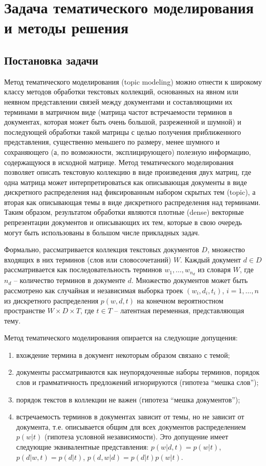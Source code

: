 \chapter{Задача тематического моделирования и методы решения}


\section{Постановка задачи}

Метод тематического моделирования (topic modeling) можно отнести к широкому классу методов обработки текстовых коллекций, основанных на явном или неявном представлении связей между документами и составляющими их терминами в матричном виде (матрица частот встречаемости терминов в документах, которая может быть очень большой, разреженной и шумной) и последующей обработки такой матрицы с целью получения приближенного представления, существенно меньшего по размеру, менее шумного и сохраняющего (а, по возможности, эксплицирующего) полезную информацию, содержащуюся в исходной матрице. Метод тематического моделирования позволяет описать текстовую коллекцию в виде произведения двух матриц, где одна матрица может интерпретироваться как описывающая документы в виде дискретного распределения над фиксированным набором скрытых тем (topic), а вторая как описывающая темы в виде дискретного распределения над терминами. Таким образом, результатом обработки являются плотные (dense) векторные репрезентации документов и описывающих их тем, которые в свою очередь могут быть использованы в большом числе прикладных задач. 

Формально, рассматривается коллекция текстовых документов $D$, множество входящих в них терминов (слов или словосочетаний) $W$. Каждый документ $d \in D$ рассматривается как последовательность терминов $w_1, \ldots, w_{n_d}$ из словаря $W$, где $n_d$ -- количество терминов в документе $d$. Множество документов может быть рассмотрено как случайная и независимая выборка троек $(w_i, d_i, t_i)$, $i = 1, \ldots, n$ из дискретного распределения $p(w, d, t)$ на конечном вероятностном пространстве $W \times D \times T$, где $t \in T$ -- латентная переменная, представляющая тему. \parencite{vorontsov2015topic}

Метод тематического моделирования опирается на следующие допущения:
\begin{enumerate}
  \item вхождение термина в документ некоторым образом связано с темой;
  \item документы рассматриваются как неупорядоченные наборы терминов, порядок слов и грамматичность предложений игнорируются (гипотеза ``мешка слов'');
  \item порядок текстов в коллекции не важен (гипотеза ``мешка документов'');
  \item встречаемость терминов в документах зависит от темы, но не зависит от документа, т.е. описывается общим для всех документов распределением $p(w|t)$ (гипотеза условной независимости). Это допущение имеет следующие эквивалентные представления: $p(w|d,t) = p(w|t)$, $p(d|w,t) = p(d|t)$, $p(d, w|d) = p(d|t)p(w|t)$.
\end{enumerate}

